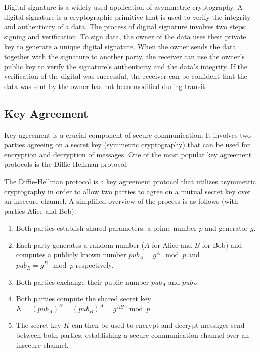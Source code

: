 Digital signature is a widely used application of asymmetric cryptography. A
digital signature is a cryptographic primitive that is used to verify the
integrity and authenticity of a data. The process of digital signature involves
two steps: signing and verification. To sign data, the owner of the data uses
their private key to generate a unique digital signature. When the owner sends
the data together with the signature to another party, the receiver can use the
owner's public key to verify the signature's authenticity and the data's
integrity. If the verification of the digital was successful, the receiver can
be confident that the data was sent by the owner has not been modified during
transit.

\subsection{Key Agreement}
\label{sec:key-agreement}

Key agreement is a crucial component of secure communication. It involves two
parties agreeing on a secret key (symmetric cryptography) that can be used for
encryption and decryption of messages. One of the most popular key agreement
protocols is the Diffie-Hellman protocol.

The Diffie-Hellman protocol is a key agreement protocol that utilizes asymmetric
cryptography in order to allow two parties to agree on a mutual secret key over
an insecure channel. A simplified overview of the process is as follows (with
parties Alice and Bob):

\begin{enumerate}
  \item Both parties establish shared parameters: a prime number $p$ and
        generator $g$.
  \item Each party generates a random number ($A$ for Alice and $B$ for Bob) and
        computes a publicly known number $pub_A = g^A \mod p$ and $pub_B = g^B
          \mod p$ respectively.
  \item Both parties exchange their public number $pub_A$ and $pub_B$.
  \item Both parties compute the shared secret key $K = (pub_A)^B = (pub_B)^A =
          g^{AB} \mod p$
  \item The secret key $K$ can then be used to encrypt and decrypt messages send
        between both parties, establishing a secure communication channel over
        an insecure channel.
\end{enumerate}

